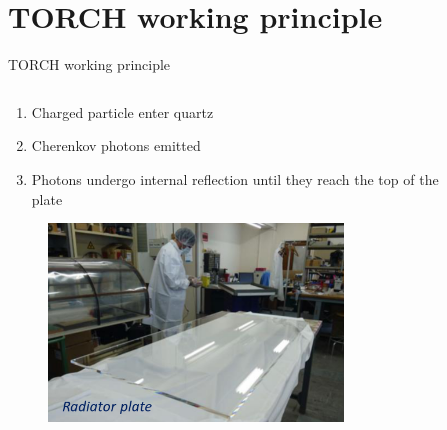 \documentclass[xcolor={dvipsnames}]{beamer}
\begin{document}
\section{TORCH working principle}
\begin{frame}{TORCH working principle}
  \begin{columns}
    \begin{column}{0.55\textwidth}
      \begin{enumerate}
        \setlength\itemsep{1.5em}
        \item{Charged particle enter quartz}
        \item{Cherenkov photons emitted}
        \item{Photons undergo internal reflection until they reach the top of the plate}
      \end{enumerate}
      \begin{figure}
        \centering
        \includegraphics[width = 0.8\textwidth]{Figs/RadiatorPlate_lab.png}
      \end{figure}
    \end{column}
    \begin{column}{0.45\textwidth}
      \begin{figure}
        \centering

\end{figure}
\end{column}
\end{columns}
\end{frame}
\end{document}
